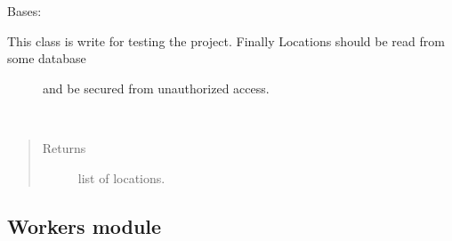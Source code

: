 \documentclass[letterpaper,10pt,english]{sphinxmanual}
\begin{document}
\begin{fulllineitems}
\label{\detokenize{doc/Access/Locations:Locations.Locations}}
Bases: 
\begin{description}
\item[{This class is write for testing the project. Finally Locations should be read from some database}] \leavevmode
and be secured from unauthorized access.

\end{description}

\begin{fulllineitems}
\label{\detokenize{doc/Access/Locations:Locations.Locations.get_locations}}~\begin{quote}\begin{description}
\item[{Returns}] \leavevmode
list of locations.

\end{description}\end{quote}

\end{fulllineitems}


\end{fulllineitems}



\subsection{Workers module}
\label{\detokenize{doc/Access/Workers:module-Workers}}\label{\detokenize{doc/Access/Workers:workers-module}}\label{\detokenize{doc/Access/Workers::doc}}
\end{document}
